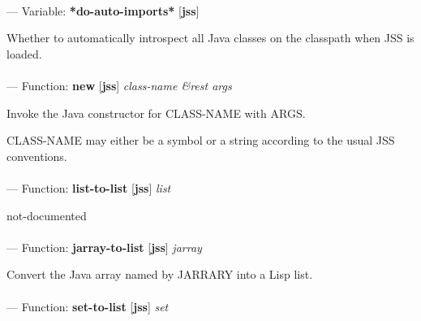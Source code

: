 \paragraph{}
\label{JSS:*DO-AUTO-IMPORTS*}
--- Variable: \textbf{*do-auto-imports*} [\textbf{jss}] \textit{}

\begin{adjustwidth}{5em}{5em}
Whether to automatically introspect all Java classes on the classpath when JSS is loaded.
\end{adjustwidth}

\paragraph{}
\label{JSS:NEW}
--- Function: \textbf{new} [\textbf{jss}] \textit{class-name \&rest args}

\begin{adjustwidth}{5em}{5em}
Invoke the Java constructor for CLASS-NAME with ARGS.

CLASS-NAME may either be a symbol or a string according to the usual JSS conventions.
\end{adjustwidth}

\paragraph{}
\label{JSS:LIST-TO-LIST}
--- Function: \textbf{list-to-list} [\textbf{jss}] \textit{list}

\begin{adjustwidth}{5em}{5em}
not-documented
\end{adjustwidth}

\paragraph{}
\label{JSS:JARRAY-TO-LIST}
--- Function: \textbf{jarray-to-list} [\textbf{jss}] \textit{jarray}

\begin{adjustwidth}{5em}{5em}
Convert the Java array named by JARRARY into a Lisp list.
\end{adjustwidth}

\paragraph{}
\label{JSS:SET-TO-LIST}
--- Function: \textbf{set-to-list} [\textbf{jss}] \textit{set}


